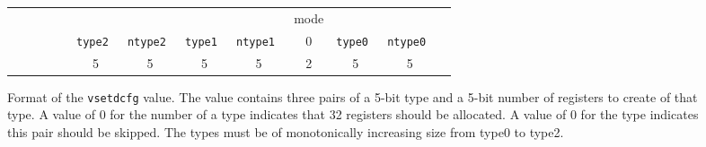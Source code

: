 \begin{figure}[b]
  \centering
  \begin{tabular}{p{1cm}p{1cm}ccc|c|c|c|c|c|c|c|l}
    \multicolumn{1}{c}{} &
    \multicolumn{1}{c}{} &
    \multicolumn{1}{c}{} &
    \multicolumn{1}{c}{} & 
    \multicolumn{1}{c}{} &
    \multicolumn{1}{c}{} &
    \multicolumn{1}{c}{} &
    \multicolumn{1}{c}{} &
    \multicolumn{1}{c}{} &
    \multicolumn{1}{c}{mode} &
    \multicolumn{1}{c}{} &
    \multicolumn{1}{c}{} &  \\
    \cline{6-12}
    & & & & &
    \tt type2 & \tt ntype2 &
    \tt type1 & \tt ntype1 &
    0 &
    \tt type0 & \tt ntype0 &  \\
    \cline{6-12}
    \multicolumn{1}{c}{} &
    \multicolumn{1}{c}{} &
    \multicolumn{1}{c}{} &
    \multicolumn{1}{c}{} & 
    \multicolumn{1}{c}{} &
    \multicolumn{1}{c}{5} &
    \multicolumn{1}{c}{5} &
    \multicolumn{1}{c}{5} &
    \multicolumn{1}{c}{5} &
    \multicolumn{1}{c}{2} &
    \multicolumn{1}{c}{5} &
    \multicolumn{1}{c}{5} &  \\
  \end{tabular}
  \caption{Format of the {\tt vsetdcfg} value.  The value contains
    three pairs of a 5-bit type and a 5-bit number of registers
    to create of that type. A value of 0 for the number of a type
    indicates that 32 registers should be allocated.  A value of 0 for
    the type indicates this pair should be skipped.  The types must be
    of monotonically increasing size from type0 to type2. }
  \label{fig:vdcfg}
\end{figure}

